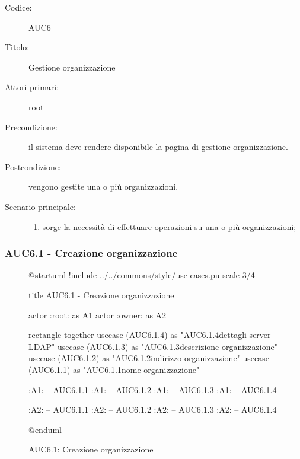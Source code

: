 \documentclass[casi-duso]{subfiles}
\begin{document}
\begin{description}
  \item[Codice:] AUC6
  \item[Titolo:] Gestione organizzazione
  \item[Attori primari:] root
  \item[Precondizione:] il sistema deve rendere disponibile la pagina di gestione organizzazione.
  \item[Postcondizione:] vengono gestite una o più organizzazioni.
  \item[Scenario principale:]
  \begin{enumerate}
    \item sorge la necessità di effettuare operazioni su una o più organizzazioni;
  \end{enumerate}
\end{description}

  \subsubsection{AUC6.1 - Creazione organizzazione}%
  \label{subsub:AUC6.1}

  \begin{figure}[h!] 
    \centering 
    \begin{plantuml}
    @startuml
    !include ../../commons/style/use-cases.pu
    scale 3/4

    title AUC6.1 - Creazione organizzazione

    actor :root: as A1
    actor :owner: as A2


    rectangle {
      together {
        usecase (AUC6.1.4) as "AUC6.1.4\nConfigurazione dettagli server LDAP"
        usecase (AUC6.1.3) as "AUC6.1.3\nInserisci descrizione organizzazione"
        usecase (AUC6.1.2) as "AUC6.1.2\nInserisci indirizzo organizzazione"
        usecase (AUC6.1.1) as "AUC6.1.1\nInserisci nome organizzazione"
      }
    }

    :A1: -- AUC6.1.1
    :A1: -- AUC6.1.2
    :A1: -- AUC6.1.3
    :A1: -- AUC6.1.4

    :A2: -- AUC6.1.1
    :A2: -- AUC6.1.2
    :A2: -- AUC6.1.3
    :A2: -- AUC6.1.4

    @enduml
    \end{plantuml} 
    \caption{AUC6.1: Creazione organizzazione} 
    \label{fig:auc6_1} 
  \end{figure}
\end{document}
